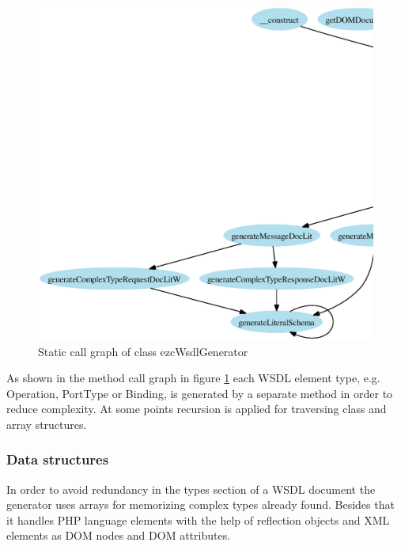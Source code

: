 \documentclass[10pt,final,a4paper,oneside]{article}
\begin{document}
\begin{figure}[htbp]
	\centering
		\includegraphics[width=1.00\textwidth]{figures/callgraph-Generators-class.WSDLGenerator.ps}
	\caption{Static call graph of class ezcWsdlGenerator}
	\label{fig:callgraph-Generators-class.WSDLGenerator}
\end{figure}

As shown in the method call graph
in figure \ref{fig:callgraph-Generators-class.WSDLGenerator}
each WSDL element type, e.g. Operation, PortType or Binding,
is generated by a separate method in order to reduce complexity.
At some points recursion is applied
for traversing class and array structures.


\subsubsection{Data structures}
In order to avoid redundancy in the types section of a WSDL document
the generator uses arrays for memorizing complex types already found.
Besides that it handles
PHP language elements with the help of reflection objects
and XML elements as DOM nodes and DOM attributes.
\end{document}
